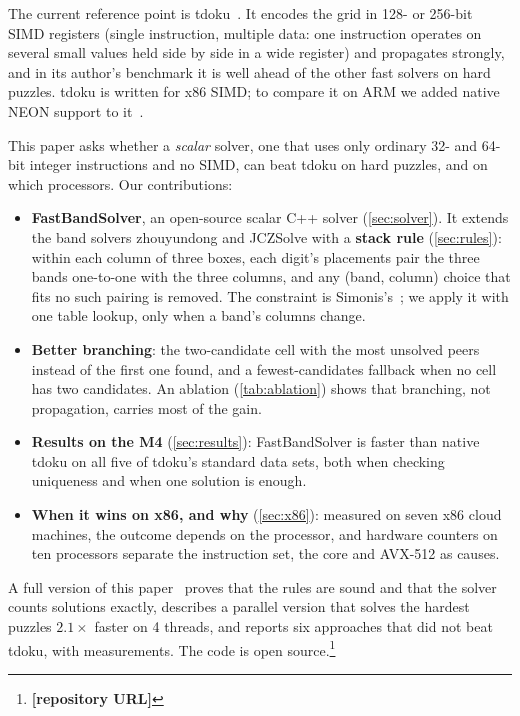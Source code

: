 \documentclass[a4paper,USenglish,cleveref,anonymous]{lipics-v2021}
\newif\ifanon
\newcommand{\selfcite}[1]{\ifanon[anonymized]\else\cite{#1}\fi}
\begin{document}
The current reference point is tdoku~\cite{dillon2019tdoku,dillon2019nerdsniped}. It encodes the grid in 128- or
256-bit SIMD registers (single instruction, multiple data: one instruction operates on several small values held side
by side in a wide register) and propagates strongly, and in its author's benchmark it is well ahead of the other fast
solvers on hard puzzles. tdoku is written for x86 SIMD; to compare it on ARM we added native NEON support to
it~\selfcite{kelly2026tdokuarm}.

This paper asks whether a \emph{scalar} solver, one that uses only ordinary 32- and 64-bit integer instructions and no SIMD, can beat tdoku on hard puzzles, and on which processors. Our contributions:
\begin{itemize}
\item \textbf{FastBandSolver}, an open-source scalar C++ solver (\cref{sec:solver}). It extends the band solvers
  zhouyundong and JCZSolve with a \textbf{stack rule} (\cref{sec:rules}): within each column of three boxes, each digit's
  placements pair the three bands one-to-one with the three columns, and any (band, column) choice that fits no such
  pairing is removed. The constraint is Simonis's~\cite{simonis2005sudoku}; we apply it with one table lookup, only when
  a band's columns change.
\item \textbf{Better branching}: the two-candidate cell with the most unsolved peers instead of the first one found,
  and a fewest-candidates fallback when no cell has two candidates. An ablation (\cref{tab:ablation}) shows that
  branching, not propagation, carries most of the gain.
\item \textbf{Results on the M4} (\cref{sec:results}): FastBandSolver is faster than native tdoku on all five of
  tdoku's standard data sets, both when checking uniqueness and when one solution is enough.
\item \textbf{When it wins on x86, and why} (\cref{sec:x86}): measured on seven x86 cloud machines, the outcome depends
  on the processor, and hardware counters on ten processors separate the instruction set, the core and AVX-512 as
  causes.
\end{itemize}
A full version of this paper~\selfcite{kelly2026full} proves that the rules are sound and that the solver counts solutions
exactly, describes a parallel version that solves the hardest puzzles $2.1\times$ faster on 4 threads, and reports six
approaches that did not beat tdoku, with measurements. The code is open source.\footnote{\ifanon\textbf{[anonymized repository URL]}\else\textbf{[repository URL]}\fi}
\end{document}
